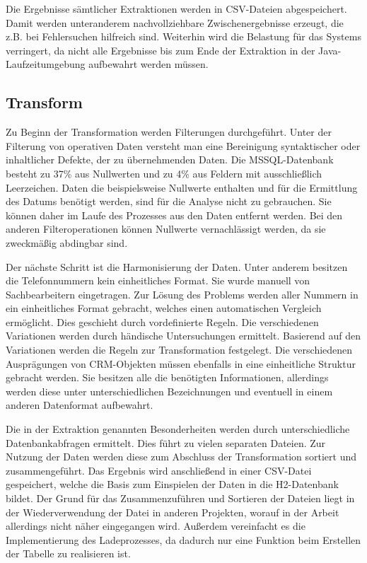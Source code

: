Die Ergebnisse sämtlicher Extraktionen werden in CSV-Dateien abgespeichert. Damit werden unteranderem nachvollziehbare Zwischenergebnisse erzeugt, die z.B. bei Fehlersuchen hilfreich sind. Weiterhin wird die Belastung für das  Systems verringert, da nicht alle Ergebnisse bis zum Ende der Extraktion in der Java-Laufzeitumgebung aufbewahrt werden müssen.

\subsection{Transform}

Zu Beginn der Transformation werden Filterungen durchgeführt. Unter der Filterung von operativen Daten versteht man eine Bereinigung syntaktischer oder inhaltlicher Defekte, der zu übernehmenden Daten. Die MSSQL-Datenbank besteht zu 37\% aus Nullwerten und zu 4\% aus Feldern mit ausschließlich Leerzeichen. Daten die beispielsweise Nullwerte enthalten und für die Ermittlung des Datums benötigt werden, sind für die Analyse nicht zu gebrauchen. Sie können daher im Laufe des Prozesses aus den Daten entfernt werden. Bei den anderen Filteroperationen können Nullwerte vernachlässigt werden, da sie zweckmäßig abdingbar sind.

Der nächste Schritt ist die Harmonisierung der Daten. Unter anderem besitzen die Telefonnummern kein einheitliches Format. Sie wurde manuell von Sachbearbeitern eingetragen. Zur Lösung des Problems werden aller Nummern in ein einheitliches Format gebracht, welches einen automatischen Vergleich ermöglicht. Dies geschieht durch vordefinierte Regeln. Die verschiedenen Variationen werden durch händische Untersuchungen ermittelt. Basierend auf den Variationen werden die Regeln zur Transformation festgelegt. Die verschiedenen Ausprägungen von CRM-Objekten müssen ebenfalls in eine einheitliche Struktur gebracht werden. Sie besitzen alle die benötigten Informationen, allerdings werden diese unter unterschiedlichen Bezeichnungen und eventuell in einem anderen Datenformat aufbewahrt.

Die in der Extraktion genannten Besonderheiten werden durch unterschiedliche Datenbankabfragen ermittelt. Dies führt zu vielen separaten Dateien. Zur Nutzung der Daten werden diese zum Abschluss der Transformation sortiert und zusammengeführt. Das Ergebnis wird anschließend in einer CSV-Datei gespeichert, welche die Basis zum Einspielen der Daten in die H2-Datenbank bildet. Der Grund für das Zusammenzuführen und Sortieren der Dateien liegt in der Wiederverwendung der Datei in anderen Projekten, worauf in der Arbeit allerdings nicht näher eingegangen wird. Außerdem vereinfacht es die Implementierung des Ladeprozesses, da dadurch nur eine Funktion beim Erstellen der Tabelle zu realisieren ist.

